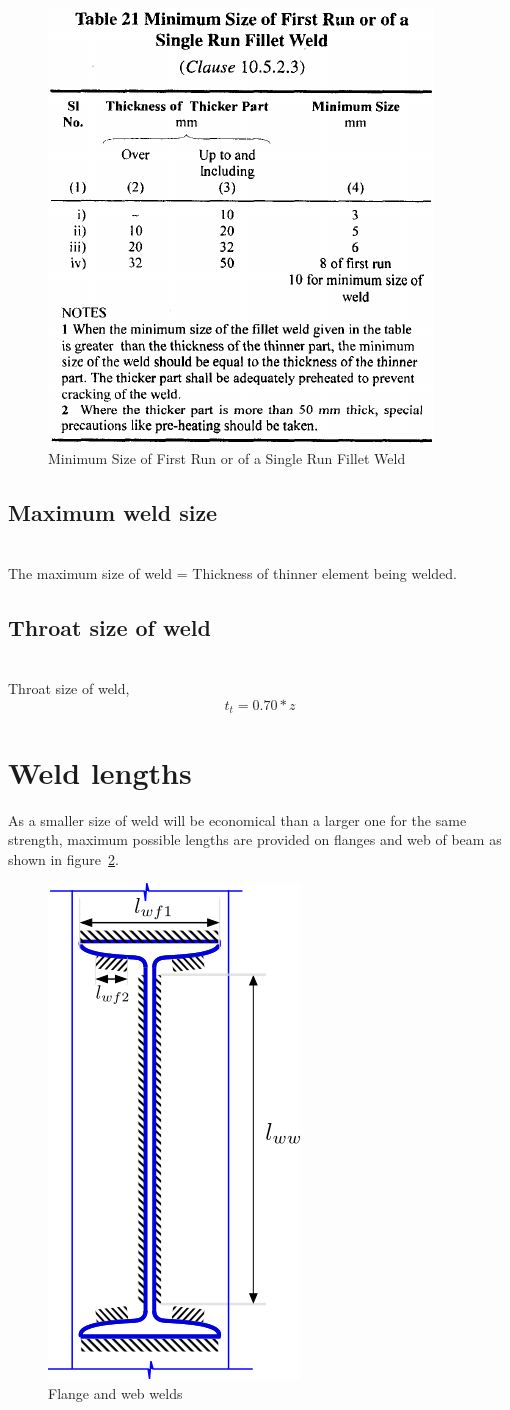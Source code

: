 \documentclass[11.5pt,a4paper,oneside]{report}
\begin{document}
\begin{Form}
\begin{figure}
	\centering
	\includegraphics[width=0.3\linewidth]{min_weld}
	\caption{Minimum Size of First Run or of a Single Run Fillet Weld}
	\label{fig:minweld}
\end{figure}

\subsection{Maximum weld size}
\quad \quad [Reference: Cl. 10.5.3, IS 800:2007] \\

The maximum size of weld = Thickness of thinner element being welded. \\


\subsection{Throat size of weld}
\quad \quad [Reference: Cl. 10.5.3.2, IS 800:2007] \\
Throat size of weld, 
\begin{equation}
	t_t = 0.70 * z
\end{equation}


\section{Weld lengths}
As a smaller size of weld will be economical than a larger one for the same strength, maximum possible lengths are provided on flanges and web of beam as shown in figure~\ref{fig:weldlength}.
\begin{figure}[h]
	\centering
	\includegraphics[width=0.2\linewidth]{weld_length}
	\caption{Flange and web welds}
	\label{fig:weldlength}
\end{figure}


\end{Form}
\end{document}
